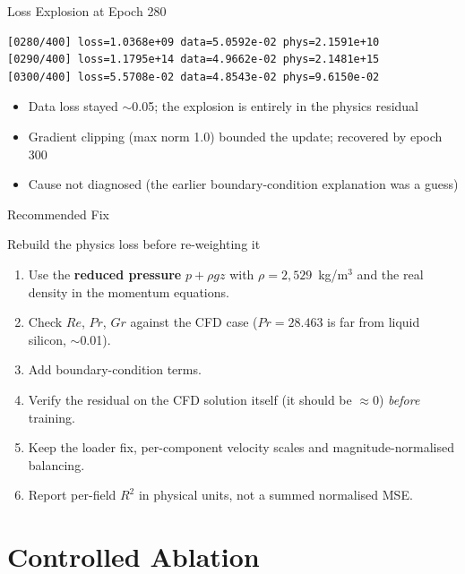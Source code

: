 \documentclass[aspectratio=169]{beamer}
\begin{document}
\begin{frame}[fragile]{Loss Explosion at Epoch 280}
\begin{verbatim}
[0280/400] loss=1.0368e+09 data=5.0592e-02 phys=2.1591e+10
[0290/400] loss=1.1795e+14 data=4.9662e-02 phys=2.1481e+15
[0300/400] loss=5.5708e-02 data=4.8543e-02 phys=9.6150e-02
\end{verbatim}

\vspace{0.3cm}
\begin{itemize}
  \item Data loss stayed $\sim$0.05; the explosion is entirely in the physics residual
  \item Gradient clipping (max norm 1.0) bounded the update; recovered by epoch 300
  \item Cause not diagnosed (the earlier boundary-condition explanation was a guess)
\end{itemize}
\end{frame}

\begin{frame}{Recommended Fix}
\begin{alertblock}{Rebuild the physics loss before re-weighting it}
\begin{enumerate}
  \item Use the \textbf{reduced pressure} $p+\rho g z$ with $\rho=2{,}529$~kg/m$^3$ and the real density in the momentum equations.
  \item Check $Re$, $Pr$, $Gr$ against the CFD case ($Pr=28.463$ is far from liquid silicon, $\sim$0.01).
  \item Add boundary-condition terms.
  \item Verify the residual on the CFD solution itself (it should be $\approx0$) \emph{before} training.
  \item Keep the loader fix, per-component velocity scales and magnitude-normalised balancing.
  \item Report per-field $R^2$ in physical units, not a summed normalised MSE.
\end{enumerate}
\end{alertblock}
\end{frame}

\section{Controlled Ablation}
\end{document}

